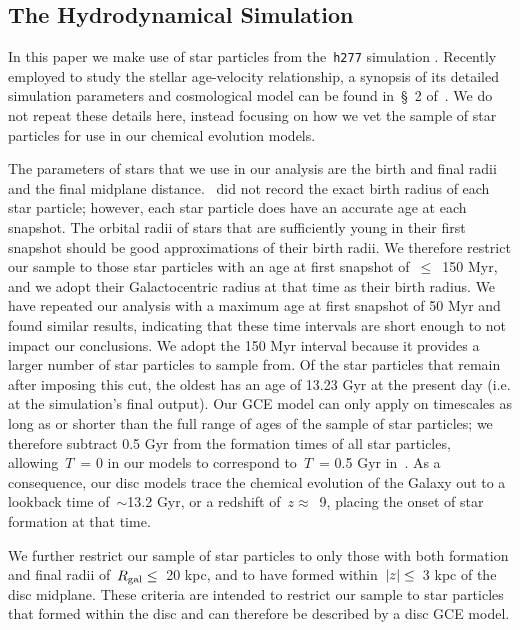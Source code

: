 \documentclass[draft2.tex]{subfiles}
\begin{document}
\subsection{The Hydrodynamical Simulation} 
\label{sec:methods:h277} 
In this paper we make use of star particles from the~\texttt{h277} simulation 
\citep{Christensen2012, Zolotov2012, Loebman2012, Loebman2014, Brooks2014}. 
Recently employed to study the stellar age-velocity relationship, a synopsis of 
its detailed simulation parameters and cosmological model can be found in~\S~2 
of~\citet{Bird2020}. 
We do not repeat these details here, instead focusing on how we vet the sample 
of star particles for use in our chemical evolution models. 
\par 
The parameters of stars that we use in our analysis are the birth and final 
radii and the final midplane distance. 
\hsim~did not record the exact birth radius of each star particle; however, 
each star particle does have an accurate age at each snapshot. 
The orbital radii of stars that are sufficiently young in their first snapshot 
should be good approximations of their birth radii. 
We therefore restrict our sample to those star particles with an age at first 
snapshot of~$\leq$~150 Myr, and we adopt their Galactocentric radius at that 
time as their birth radius. 
We have repeated our analysis with a maximum age at first snapshot of 50 
Myr and found similar results, indicating that these time intervals are short 
enough to not impact our conclusions. 
We adopt the 150 Myr interval because it provides a larger number of star 
particles to sample from. 
Of the star particles that remain after imposing this cut, the oldest has an 
age of 13.23 Gyr at the present day (i.e. at the simulation's final output). 
Our GCE model can only apply on timescales as long as or shorter than the full 
range of ages of the sample of star particles; we therefore subtract 0.5 Gyr 
from the formation times of all star particles, allowing~$T$~= 0 in our models 
to correspond to~$T$~= 0.5 Gyr in~\hsim. 
As a consequence, our disc models trace the chemical evolution of the Galaxy 
out to a lookback time of~$\sim$13.2 Gyr, or a redshift of~$z \approx$~9, 
placing the onset of star formation at that time. 
\par 
We further restrict our sample of star particles to only those with both 
formation and final radii of~$R_\text{gal} \leq$~20 kpc, and to have formed 
within~$\left|z\right|\leq$~3 kpc of the disc midplane. 
These criteria are intended to restrict our sample to star particles that 
formed within the disc and can therefore be described by a disc GCE model. 
\end{document}
